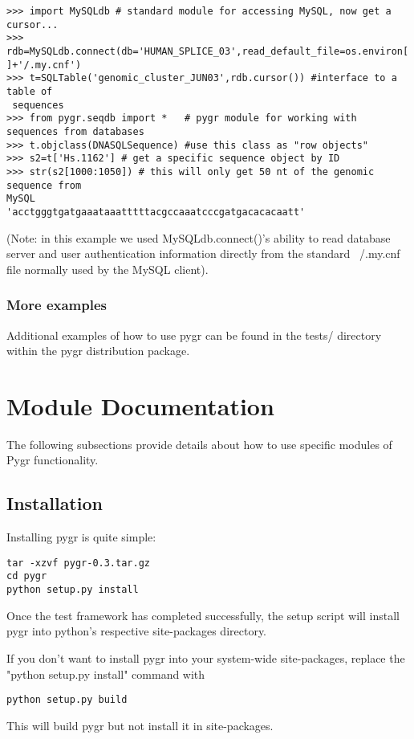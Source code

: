 \documentclass{howto}
\begin{document}
\begin{verbatim}
>>> import MySQLdb # standard module for accessing MySQL, now get a cursor...
>>> rdb=MySQLdb.connect(db='HUMAN_SPLICE_03',read_default_file=os.environ['HOME'
]+'/.my.cnf')
>>> t=SQLTable('genomic_cluster_JUN03',rdb.cursor()) #interface to a table of
 sequences
>>> from pygr.seqdb import *   # pygr module for working with sequences from databases
>>> t.objclass(DNASQLSequence) #use this class as "row objects"
>>> s2=t['Hs.1162'] # get a specific sequence object by ID
>>> str(s2[1000:1050]) # this will only get 50 nt of the genomic sequence from 
MySQL
'acctgggtgatgaaataaatttttacgccaaatcccgatgacacacaatt'
\end{verbatim}

(Note: in this example we used MySQLdb.connect()'s ability to read database 
server and user authentication information directly from the standard ~/.my.cnf file normally used by the MySQL client).

\subsubsection{More examples}
\label{more-exam}

Additional examples of how to use pygr can be found in the tests/ directory within the pygr distribution package.




\section{Module Documentation}
\label{module-doc}

The following subsections provide details about how to use specific
modules of Pygr functionality. 

\subsection{Installation}
\label{install}
Installing pygr is quite simple:
\begin{verbatim}
tar -xzvf pygr-0.3.tar.gz 
cd pygr
python setup.py install 
\end{verbatim}

Once the test framework has completed successfully, the setup script
will install pygr into python's respective site-packages directory. 

If you don't want to install pygr into your system-wide site-packages,
replace the "python setup.py install" command with
\begin{verbatim}
python setup.py build
\end{verbatim}
This will build pygr but not install it in site-packages.
\end{document}
